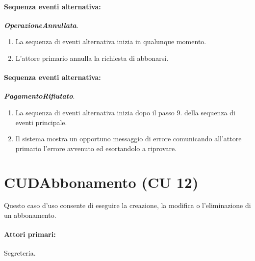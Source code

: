 \documentclass{article}
\begin{document}
	\paragraph{Sequenza eventi alternativa:} \textbf{\textit{OperazioneAnnullata}}.
	\begin{enumerate}[itemsep=8pt,parsep=0pt]
	\item La sequenza di eventi alternativa inizia in qualunque momento.
	\item L'attore primario annulla la richiesta di abbonarsi.
	\end{enumerate}
	
	
	\paragraph{Sequenza eventi alternativa:} \textbf{\textit{PagamentoRifiutato}}.
	\begin{enumerate}[itemsep=8pt,parsep=0pt]
	\item La sequenza di eventi alternativa inizia dopo il passo 9. della sequenza di eventi principale.
	\item Il sistema mostra un opportuno messaggio di errore comunicando all'attore primario l'errore avvenuto ed esortandolo a riprovare.
	\end{enumerate}
	



\newpage	
\section*{CUDAbbonamento (CU 12)}
	
	\indent\indent Questo caso d'uso consente di eseguire la creazione, la modifica o l'eliminazione di un abbonamento.
	
	\paragraph{Attori primari:}Segreteria.
	
\end{document}
